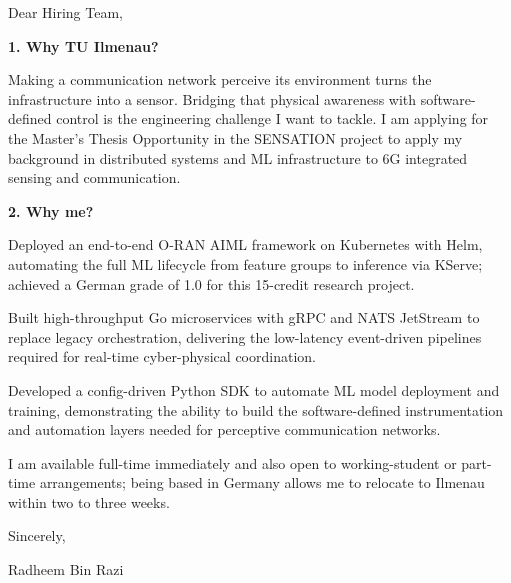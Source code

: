 \documentclass[11pt,a4paper]{coverletter}
\begin{document}

\opening{Dear Hiring Team,}

\vspace{8pt}\noindent\textbf{1. Why TU Ilmenau?}\par\vspace{3pt}

Making a communication network perceive its environment turns the infrastructure into a sensor. Bridging that physical awareness with software-defined control is the engineering challenge I want to tackle. I am applying for the Master's Thesis Opportunity in the SENSATION project to apply my background in distributed systems and ML infrastructure to 6G integrated sensing and communication.

\vspace{8pt}\noindent\textbf{2. Why me?}\par\vspace{3pt}

\bullets

  \item Deployed an end-to-end O-RAN AIML framework on Kubernetes with Helm, automating the full ML lifecycle from feature groups to inference via KServe; achieved a German grade of 1.0 for this 15-credit research project.

  \item Built high-throughput Go microservices with gRPC and NATS JetStream to replace legacy orchestration, delivering the low-latency event-driven pipelines required for real-time cyber-physical coordination.

  \item Developed a config-driven Python SDK to automate ML model deployment and training, demonstrating the ability to build the software-defined instrumentation and automation layers needed for perceptive communication networks.

\bulletsend

I am available full-time immediately and also open to working-student or part-time arrangements; being based in Germany allows me to relocate to Ilmenau within two to three weeks.

\closing{Sincerely,}{Radheem Bin Razi}

\clearpage
{}

\end{document}

